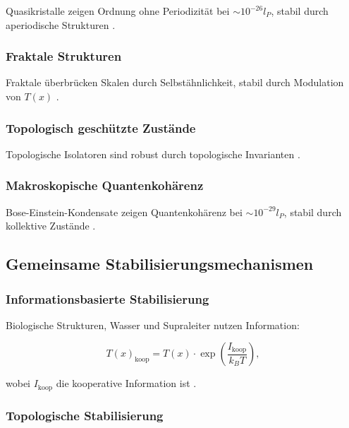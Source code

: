 \documentclass[12pt,a4paper]{article}
\newcommand{\Tfield}{T(x)}
\begin{document}
	Quasikristalle zeigen Ordnung ohne Periodizität bei $\sim 10^{-26} l_P$, stabil durch aperiodische Strukturen \cite{pascher_nateinheiten_2025}.
	
	\subsubsection{Fraktale Strukturen}
	
	Fraktale überbrücken Skalen durch Selbstähnlichkeit, stabil durch Modulation von $\Tfield$ \cite{pascher_nateinheiten_2025}.
	
	\subsubsection{Topologisch geschützte Zustände}
	
	Topologische Isolatoren sind robust durch topologische Invarianten \cite{pascher_nateinheiten_2025}.
	
	\subsubsection{Makroskopische Quantenkohärenz}
	
	Bose-Einstein-Kondensate zeigen Quantenkohärenz bei $\sim 10^{-29} l_P$, stabil durch kollektive Zustände \cite{pascher_nateinheiten_2025}.
	
	\subsection{Gemeinsame Stabilisierungsmechanismen}
	
	\subsubsection{Informationsbasierte Stabilisierung}
	
	Biologische Strukturen, Wasser und Supraleiter nutzen Information:
	
	\begin{equation}
		\Tfield_{\text{koop}} = \Tfield \cdot \exp\left(\frac{I_{\text{koop}}}{k_B T}\right),
	\end{equation}
	
	wobei $I_{\text{koop}}$ die kooperative Information ist \cite{pascher_nateinheiten_2025}.
	
	\subsubsection{Topologische Stabilisierung}
	
\end{document}
